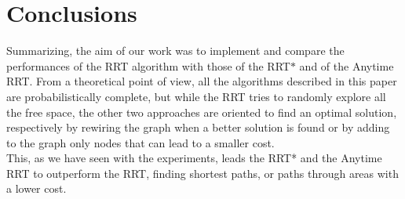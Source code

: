 \documentclass[10pt]{article}
\begin{document}
	\section{Conclusions}
	Summarizing, the aim of our work was to implement and compare the performances of the RRT algorithm with those of the RRT$*$ and of the Anytime RRT. From a theoretical point of view, all the algorithms described in this paper are probabilistically complete, but while the RRT tries to randomly explore all the free space, the other two approaches are oriented to find an optimal solution, respectively by rewiring the graph when a better solution is found or by adding to the graph only nodes that can lead to a smaller cost.\\
	This, as we have seen with the experiments, leads the RRT* and the Anytime RRT to outperform the RRT, finding shortest paths, or paths through areas with a lower cost.
\end{document}
